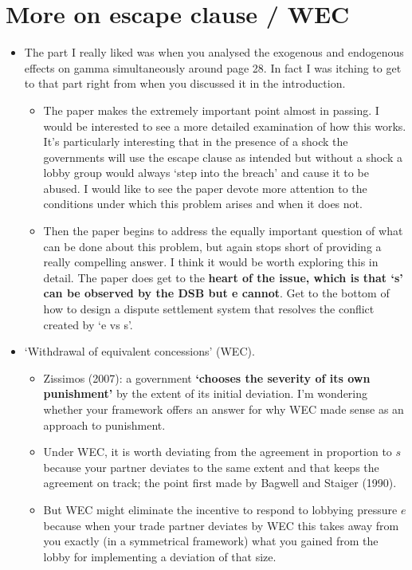 \documentclass[12pt]{article}
\begin{document}
\section{More on escape clause / WEC}
		\begin{itemize}
			\item The part I really liked was when you analysed the exogenous and endogenous effects on gamma simultaneously around page 28.  In fact I was itching to get to that part right from when you discussed it in the introduction.  
				\begin{itemize}
					\item The paper makes the extremely important point almost in passing.  I would be interested to see a more detailed examination of how this works.  It's particularly interesting that in the presence of a shock the governments will use the escape clause as intended but without a shock a lobby group would always `step into the breach' and cause it to be abused.  I would like to see the paper devote more attention to the conditions under which this problem arises and when it does not.
					\item Then the paper begins to address the equally important question of what can be done about this problem, but again stops short of providing a really compelling answer.  I think it would be worth exploring this in detail.  The paper does get to the \textbf{heart of the issue, which is that `s' can be observed by the DSB but e cannot}.  Get to the bottom of how to design a dispute settlement system that resolves the conflict created by `e vs s'.
				\end{itemize}
			\item `Withdrawal of equivalent concessions' (WEC).
				\begin{itemize}
					\item Zissimos (2007): a government \textbf{`chooses the severity of its own punishment'} by the extent of its initial deviation. I'm wondering whether your framework offers an answer for why WEC made sense as an approach to punishment.
					\item Under WEC, it is worth deviating from the agreement in proportion to $s$ because your partner deviates to the same extent and that keeps the agreement on track; the point first made by Bagwell and Staiger (1990).
					\item But WEC might eliminate the incentive to respond to lobbying pressure $e$ because when your trade partner deviates by WEC this takes away from you exactly (in a symmetrical framework) what you gained from the lobby for implementing a deviation of that size.

\end{itemize}
\end{itemize}
\end{document}
